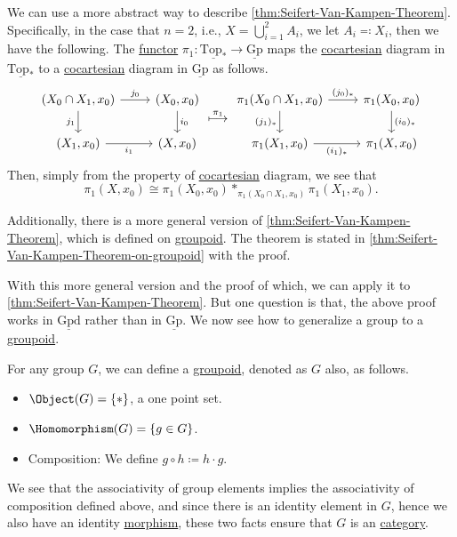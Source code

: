 \begin{remark}
	We can use a more abstract way to describe \autoref{thm:Seifert-Van-Kampen-Theorem}. Specifically, in the case that \(n = 2\), i.e., \(X = \bigcup_{i=1}^{2} A_{i} \),
	we let \(A_{i} \eqqcolon X_{i} \), then we have the following. The \hyperref[def:functor]{functor} \(\pi _1\colon \underline{\mathrm{Top}_{\ast}}\to \underline{\mathrm{Gp}}\)
	maps the \hyperref[def:cocartesian]{cocartesian} diagram in \(\underline{\mathrm{Top} _\ast}\) to a \hyperref[def:cocartesian]{cocartesian} diagram in \(\underline{\mathrm{Gp} }\)
	as follows.
	\[
		\begin{tikzcd}
			{(X_0\cap X_1, x_0)} & {(X_0, x_0)} \\
			{(X_1, x_0)} & {(X, x_0)}
			\arrow["{j_0}", from=1-1, to=1-2]
			\arrow["{i_0}", from=1-2, to=2-2]
			\arrow["{i_1}"', from=2-1, to=2-2]
			\arrow["{j_1}"', from=1-1, to=2-1]
		\end{tikzcd}\overset{\pi _1}{\longmapsto}
		\begin{tikzcd}
			{\pi_1(X_0\cap X_1, x_0)} & {\pi_1(X_0, x_0)} \\
			{\pi_1(X_1, x_0)} & {\pi_1(X, x_0)}
			\arrow["{(j_0)_\ast}", from=1-1, to=1-2]
			\arrow["{(i_0)_\ast}", from=1-2, to=2-2]
			\arrow["{(i_1)_\ast}"', from=2-1, to=2-2]
			\arrow["{(j_1)_\ast}"', from=1-1, to=2-1]
		\end{tikzcd} \]
	Then, simply from the property of \hyperref[def:cocartesian]{cocartesian} diagram, we see that
	\[
		\pi _1(X, x_0)\cong \pi _1(X_0, x_0)\ast_{\pi _1(X_0 \cap X_1, x_0)}\pi _1(X_1, x_0).
	\]
\end{remark}

Additionally, there is a more general version of \autoref{thm:Seifert-Van-Kampen-Theorem}, which is defined on \hyperref[def:groupoid]{groupoid}. The theorem is
stated in \autoref{thm:Seifert-Van-Kampen-Theorem-on-groupoid} with the proof.

With this more general version and the proof of which, we can apply it to \autoref{thm:Seifert-Van-Kampen-Theorem}. But one question is that, the above proof
works in \(\underline{\mathrm{Gpd}}\) rather than in \(\underline{\mathrm{Gp}}\). We now see how to generalize a group to a \hyperref[def:groupoid]{groupoid}.

For any group \(G\), we can define a \hyperref[def:groupoid]{groupoid}, denoted as \(G\) also, as follows.
\begin{itemize}
	\item \(\Object (G) = \{\ast \}\), a one point set.
	\item \(\Homomorphism (G) = \{g\in G\}\).
	\item Composition: We define \(g\circ h \coloneqq h\cdot g\).
\end{itemize}
We see that the associativity of group elements implies the associativity of composition defined above, and since there is an identity element in \(G\), hence we also have
an identity \hyperref[def:morphism]{morphism}, these two facts ensure that \(G\) is an \hyperref[def:category]{category}.

